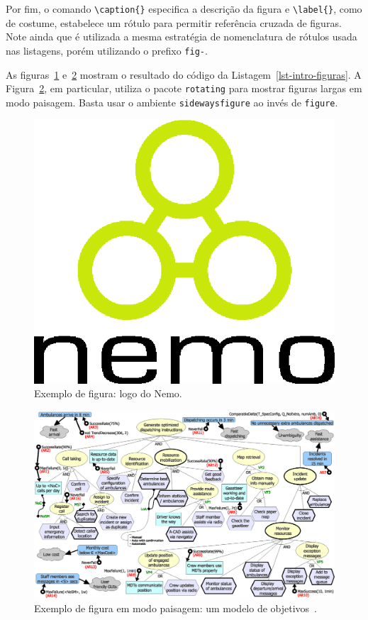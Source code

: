 Por fim, o comando \texttt{\textbackslash caption\{\}} especifica a descrição da figura e \texttt{\textbackslash label\{\}}, como de costume, estabelece um rótulo para permitir referência cruzada de figuras. Note ainda que é utilizada a mesma estratégia de nomenclatura de rótulos usada nas listagens, porém utilizando o prefixo \texttt{fig-}.

As figuras~\ref{fig-intro-nemologo} e~\ref{fig-intro-exemplosideways} mostram o resultado do código da Listagem~\ref{lst-intro-figuras}. A Figura~\ref{fig-intro-exemplosideways}, em particular, utiliza o pacote \texttt{rotating} para mostrar figuras largas em modo paisagem. Basta usar o ambiente \texttt{sidewaysfigure} ao invés de \texttt{figure}.

\begin{figure}
	\centering
	\includegraphics[width=.25\textwidth]{figuras/fig-intro-nemologo} 
	\caption{Exemplo de figura: logo do Nemo.}
	\label{fig-intro-nemologo}
\end{figure}

\begin{figure}
	\centering
	\includegraphics[width=\textwidth]{figuras/fig-intro-exemplosideways} 
	\caption{Exemplo de figura em modo paisagem: um modelo de objetivos~\cite{souza-mylopoulos:spe13}.}
	\label{fig-intro-exemplosideways}
\end{figure}




